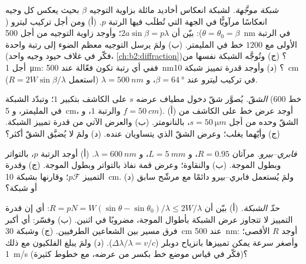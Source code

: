 \begin{exercise}[$\star\star$]\label{exo:b2:gratings:7}
\emph{شبكة موجَّهة.} لشبكة انعكاس أخاديد مائلة بزاوية
التوجيه $\beta$ بحيث يعكس كل وجيه انعكاسًا مرآويًّا في
الجهة التي تُطلَب فيها الرتبة $p$. (أ) ومن أجل تركيب ليترو
($\theta = \theta_0 = \beta$): بيّن أن $2a\sin\beta = p\lambda$؛ وأوجد زاوية التوجيه من أجل
\qty{500}{nm} في الرتبة الأولى مع $1200$ خط في المليمتر. (ب) ولمَ يرسل التوجيه معظم
الضوء إلى رتبة واحدة (فكّر في غلاف حيود وجيه واحد،
\cref{ch:b2:diffraction})؟ (ج) وتُوجَّه الشبكة نفسها
من أجل \qty{1}{\micro m}: ففي أي رتبة تكون فعّالة عند \qty{500}{nm}؟ (د)
وأوجد قدرة تمييز شبكة \qty{10}{cm} في تركيب ليترو عند $\beta = \qty{64}{\degree}$،
و $\lambda = \qty{500}{nm}$ (استعمل $R = 2W\sin\beta/\lambda$).
\end{exercise}

\begin{exercise}[$\star\star$]\label{exo:b2:gratings:8}
\emph{الشقّ.} يُصوَّر شقّ دخول مطياف عرضه $s$
على الكاشف بتكبير $1$؛ وتبدّد الشبكة ($600$ خط في المليمتر،
و \qty{5}{cm}، والرتبة $1$، و $f = \qty{50}{cm}$). (أ) أوجد عرض خط على
الكاشف من الشقّ وحده من أجل $s = \qty{50}{\micro m}$، بالنانومتر. (ب)
والعرض الآتي من قدرة تمييز الشبكة. (ج) وأيّهما يغلب؛ وعرض الشقّ
الذي يتساويان عنده. (د) ولمَ لا يُضيَّق الشقّ أكثر؟
\end{exercise}

\begin{exercise}[$\star\star$]\label{exo:b2:gratings:9}
\emph{فابري--بيرو.} مرآتان $R = 0.95$، و $L = \qty{5}{mm}$، و $\lambda = \qty{600}{nm}$.
(أ) أوجد الرتبة $p$،  بالتواتر وبطول الموجة. (ب)
والنقاوة؛ وعرض قمة نفاذ بالتواتر وبطول الموجة. (ج)
وقدرة التمييز $p\mathcal F$؛ وقارنها بشبكة \qty{10}{cm}. (د) ولمَ
يُستعمل فابري--بيرو دائمًا مع مرشّح سابق أو شبكة؟
\end{exercise}

\begin{exercise}[$\star\star\star$]\label{exo:b2:gratings:10}
\emph{حدّ الشبكة.} (أ) بيّن أن $R = pN = W(\sin\theta - \sin\theta_0)
/\lambda \le 2W/\lambda$: أي إن قدرة التمييز لا تتجاوز عرض
الشبكة بأطوال الموجة، مضروبًا في اثنين. (ب) وفسّر: أي أكبر فرق
مسير بين الشعاعين الطرفيين. (ج) وشبكة \qty{30}{cm} عند
\qty{500}{nm}: أوجد $R$ الأقصى؛ وأصغر سرعة يمكن تمييزها بانزياح دوبلر
($\Delta\lambda/\lambda = v/c$). (د) ولمَ يبلغ الفلكيون مع ذلك \qty{1}{m/s}
(فكّر في قياس موضع خط بكسر من عرضه،
مع خطوط كثيرة)؟
\end{exercise}

